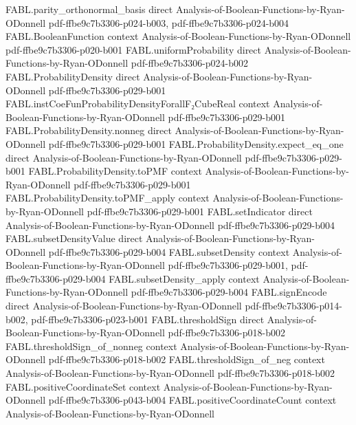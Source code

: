 \begin{theorem}
\proofstep
  {FABL.parity_orthonormal_basis}
  {direct}
  {Analysis-of-Boolean-Functions-by-Ryan-ODonnell}
  {pdf-ffbe9c7b3306-p024-b003,
    pdf-ffbe9c7b3306-p024-b004}
\proofstep
  {FABL.BooleanFunction}
  {context}
  {Analysis-of-Boolean-Functions-by-Ryan-ODonnell}
  {pdf-ffbe9c7b3306-p020-b001}
\proofstep
  {FABL.uniformProbability}
  {direct}
  {Analysis-of-Boolean-Functions-by-Ryan-ODonnell}
  {pdf-ffbe9c7b3306-p024-b002}
\proofstep
  {FABL.ProbabilityDensity}
  {direct}
  {Analysis-of-Boolean-Functions-by-Ryan-ODonnell}
  {pdf-ffbe9c7b3306-p029-b001}
\proofstep
  {FABL.instCoeFunProbabilityDensityForallF₂CubeReal}
  {context}
  {Analysis-of-Boolean-Functions-by-Ryan-ODonnell}
  {pdf-ffbe9c7b3306-p029-b001}
\proofstep
  {FABL.ProbabilityDensity.nonneg}
  {direct}
  {Analysis-of-Boolean-Functions-by-Ryan-ODonnell}
  {pdf-ffbe9c7b3306-p029-b001}
\proofstep
  {FABL.ProbabilityDensity.expect_eq_one}
  {direct}
  {Analysis-of-Boolean-Functions-by-Ryan-ODonnell}
  {pdf-ffbe9c7b3306-p029-b001}
\proofstep
  {FABL.ProbabilityDensity.toPMF}
  {context}
  {Analysis-of-Boolean-Functions-by-Ryan-ODonnell}
  {pdf-ffbe9c7b3306-p029-b001}
\proofstep
  {FABL.ProbabilityDensity.toPMF_apply}
  {context}
  {Analysis-of-Boolean-Functions-by-Ryan-ODonnell}
  {pdf-ffbe9c7b3306-p029-b001}
\proofstep
  {FABL.setIndicator}
  {direct}
  {Analysis-of-Boolean-Functions-by-Ryan-ODonnell}
  {pdf-ffbe9c7b3306-p029-b004}
\proofstep
  {FABL.subsetDensityValue}
  {direct}
  {Analysis-of-Boolean-Functions-by-Ryan-ODonnell}
  {pdf-ffbe9c7b3306-p029-b004}
\proofstep
  {FABL.subsetDensity}
  {context}
  {Analysis-of-Boolean-Functions-by-Ryan-ODonnell}
  {pdf-ffbe9c7b3306-p029-b001,
    pdf-ffbe9c7b3306-p029-b004}
\proofstep
  {FABL.subsetDensity_apply}
  {context}
  {Analysis-of-Boolean-Functions-by-Ryan-ODonnell}
  {pdf-ffbe9c7b3306-p029-b004}
\proofstep
  {FABL.signEncode}
  {direct}
  {Analysis-of-Boolean-Functions-by-Ryan-ODonnell}
  {pdf-ffbe9c7b3306-p014-b002,
    pdf-ffbe9c7b3306-p023-b001}
\proofstep
  {FABL.thresholdSign}
  {direct}
  {Analysis-of-Boolean-Functions-by-Ryan-ODonnell}
  {pdf-ffbe9c7b3306-p018-b002}
\proofstep
  {FABL.thresholdSign_of_nonneg}
  {context}
  {Analysis-of-Boolean-Functions-by-Ryan-ODonnell}
  {pdf-ffbe9c7b3306-p018-b002}
\proofstep
  {FABL.thresholdSign_of_neg}
  {context}
  {Analysis-of-Boolean-Functions-by-Ryan-ODonnell}
  {pdf-ffbe9c7b3306-p018-b002}
\proofstep
  {FABL.positiveCoordinateSet}
  {context}
  {Analysis-of-Boolean-Functions-by-Ryan-ODonnell}
  {pdf-ffbe9c7b3306-p043-b004}
\proofstep
  {FABL.positiveCoordinateCount}
  {context}
  {Analysis-of-Boolean-Functions-by-Ryan-ODonnell}

\end{theorem}
